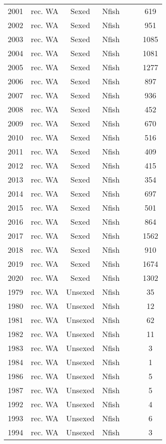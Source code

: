 \begin{longtable}[t]{c>{\centering\arraybackslash}p{3cm}ccccc}
2001 & rec. WA & Sexed & Nfish &  &  & 619\\
2002 & rec. WA & Sexed & Nfish &  &  & 951\\
2003 & rec. WA & Sexed & Nfish &  &  & 1085\\
2004 & rec. WA & Sexed & Nfish &  &  & 1081\\
2005 & rec. WA & Sexed & Nfish &  &  & 1277\\
2006 & rec. WA & Sexed & Nfish &  &  & 897\\
2007 & rec. WA & Sexed & Nfish &  &  & 936\\
2008 & rec. WA & Sexed & Nfish &  &  & 452\\
2009 & rec. WA & Sexed & Nfish &  &  & 670\\
2010 & rec. WA & Sexed & Nfish &  &  & 516\\
2011 & rec. WA & Sexed & Nfish &  &  & 409\\
2012 & rec. WA & Sexed & Nfish &  &  & 415\\
2013 & rec. WA & Sexed & Nfish &  &  & 354\\
2014 & rec. WA & Sexed & Nfish &  &  & 697\\
2015 & rec. WA & Sexed & Nfish &  &  & 501\\
2016 & rec. WA & Sexed & Nfish &  &  & 864\\
2017 & rec. WA & Sexed & Nfish &  &  & 1562\\
2018 & rec. WA & Sexed & Nfish &  &  & 910\\
2019 & rec. WA & Sexed & Nfish &  &  & 1674\\
2020 & rec. WA & Sexed & Nfish &  &  & 1302\\
1979 & rec. WA & Unsexed & Nfish &  &  & 35\\
1980 & rec. WA & Unsexed & Nfish &  &  & 12\\
1981 & rec. WA & Unsexed & Nfish &  &  & 62\\
1982 & rec. WA & Unsexed & Nfish &  &  & 11\\
1983 & rec. WA & Unsexed & Nfish &  &  & 3\\
1984 & rec. WA & Unsexed & Nfish &  &  & 1\\
1986 & rec. WA & Unsexed & Nfish &  &  & 5\\
1987 & rec. WA & Unsexed & Nfish &  &  & 5\\
1992 & rec. WA & Unsexed & Nfish &  &  & 4\\
1993 & rec. WA & Unsexed & Nfish &  &  & 6\\
1994 & rec. WA & Unsexed & Nfish &  &  & 3\\

\end{longtable}

